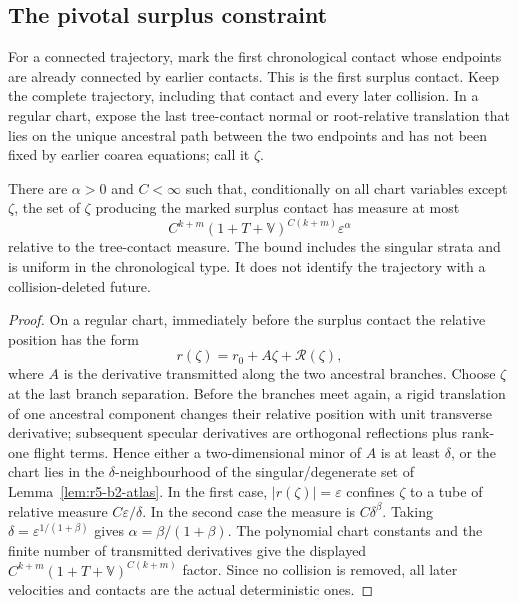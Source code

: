 \subsection{The pivotal surplus constraint}

For a connected trajectory, mark the first chronological contact whose
endpoints are already connected by earlier contacts.  This is the first
surplus contact.  Keep the complete trajectory, including that contact and
every later collision.  In a regular chart, expose the last tree-contact
normal or root-relative translation that lies on the unique ancestral path
between the two endpoints and has not been fixed by earlier coarea equations;
call it \(\zeta\).

\begin{theorem}
\label{thm:r5-b2-pivot}
There are \(\alpha>0\) and \(C<\infty\) such that, conditionally on all chart
variables except \(\zeta\), the set of \(\zeta\) producing the marked surplus
contact has measure at most
\[
 C^{k+m}(1+T+{\mathbb V})^{C(k+m)}
 \varepsilon^\alpha
\]
relative to the tree-contact measure.  The bound includes the singular
strata and is uniform in the chronological type.  It does not identify the
trajectory with a collision-deleted future.
\end{theorem}

\begin{proof}
On a regular chart, immediately before the surplus contact the relative
position has the form
\[
 r(\zeta)=r_0+A\zeta+{\mathcal R}(\zeta),
\]
where \(A\) is the derivative transmitted along the two ancestral branches.
Choose \(\zeta\) at the last branch separation.  Before the branches meet
again, a rigid translation of one ancestral component changes their relative
position with unit transverse derivative; subsequent specular derivatives
are orthogonal reflections plus rank-one flight terms.  Hence either a
two-dimensional minor of \(A\) is at least \(\delta\), or the chart lies in
the \(\delta\)-neighbourhood of the singular/degenerate set of
Lemma~\ref{lem:r5-b2-atlas}.  In the first case,
\(|r(\zeta)|=\varepsilon\) confines \(\zeta\) to a tube of relative measure
\(C\varepsilon/\delta\).  In the second case the measure is
\(C\delta^\beta\).  Taking
\(\delta=\varepsilon^{1/(1+\beta)}\) gives
\(\alpha=\beta/(1+\beta)\).  The polynomial chart constants and the finite
number of transmitted derivatives give the displayed
\(C^{k+m}(1+T+{\mathbb V})^{C(k+m)}\) factor.  Since no collision is removed,
all later velocities and contacts are the actual deterministic ones.
\end{proof}

